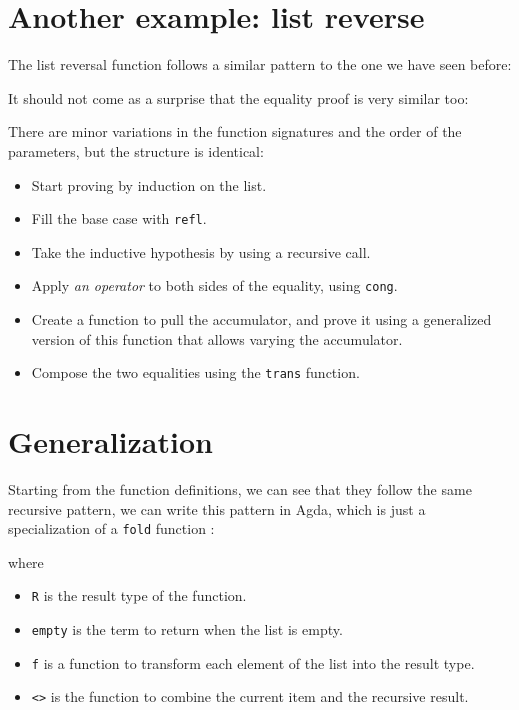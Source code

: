 \documentclass[runningheads]{llncs}
\begin{document}


\section{Another example: list reverse}

The list reversal function follows a similar pattern to the one we have seen before:



It should not come as a surprise that the equality proof is very similar too:



There are minor variations in the function signatures and the order of the parameters,
but the structure is identical:

\begin{itemize}
  \item Start proving by induction on the list.
  \item Fill the base case with \lstinline{refl}.
  \item Take the inductive hypothesis by using a recursive call.
  \item Apply \emph{an operator} to both sides of the equality, using \lstinline{cong}.
  \item Create a function to pull the accumulator, and prove it using a generalized
        version of this function that allows varying the accumulator.
  \item Compose the two equalities using the \lstinline{trans} function.
\end{itemize}

\section{Generalization}

Starting from the function definitions, we can see that they follow the same recursive
pattern, we can write this pattern in Agda, which is just a specialization of a
\lstinline{fold} function \cite{hutton1999tutorial,meijer1991functional}:



\noindent
where

\begin{itemize}
  \item \lstinline{R} is the result type of the function.
  \item \lstinline{empty} is the term to return when the list is empty.
  \item \lstinline{f} is a function to transform each element of the list into the result
        type.
  \item \lstinline{<>} is the function to combine the current item and the recursive
        result.
\end{itemize}
\end{document}
